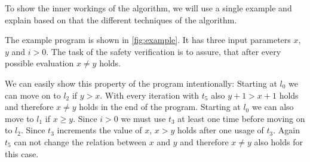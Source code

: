 

To show the inner workings of the algorithm, we will use a single example and explain based on that the different techniques of the algorithm.

The example program is shown in \ref{fig:example}.
It has three input parameters $x$, $y$ and $i>0$.
The task of the safety verification is to assure, that after every possible evaluation $x \neq y$ holds.

We can easily show this property of the program intentionally:
Starting at $l_0$ we can move on to $l_2$ if $y>x$.
With every iteration with $t_5$ also $y+1>x+1$ holds and therefore $x \neq y$ holds in the end of the program.
Starting at $l_0$ we can also move to $l_1$ if $x \geq y$.
Since $i>0$ we must use $t_3$ at least one time before moving on to $l_2$.
Since $t_3$ increments the value of $x$, $x > y$ holds after one usage of $t_3$.
Again $t_5$ can not change the relation between $x$ and $y$ and therefore $x \neq y$ also holds for this case.
